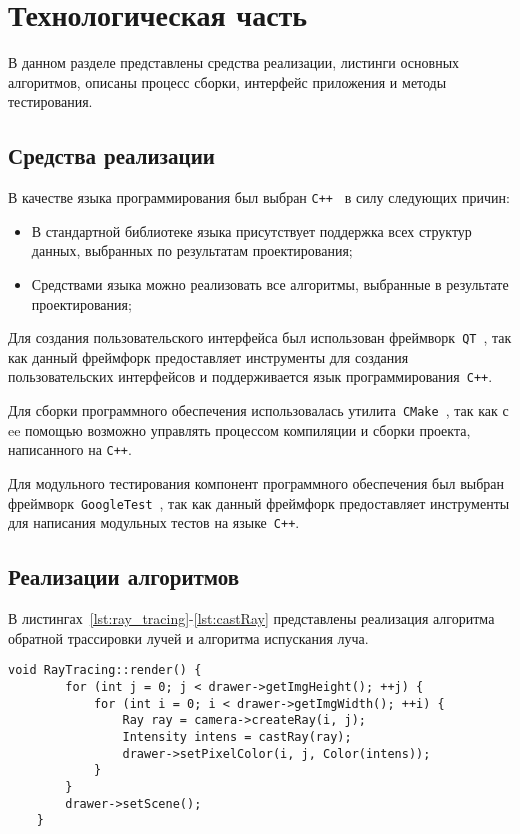 \chapter{Технологическая часть}

В данном разделе представлены средства реализации, листинги основных алгоритмов, описаны процесс сборки, интерфейс приложения и методы тестирования.

\section{Средства реализации}
В качестве языка программирования был выбран \texttt{C++}~\cite{cpp} в силу следующих причин:
\begin{itemize}
	\item В стандартной библиотеке языка присутствует поддержка всех структур данных, выбранных по результатам проектирования;
	\item Средствами языка можно реализовать все алгоритмы, выбранные в результате проектирования;
\end{itemize}

Для создания пользовательского интерфейса был использован фреймворк~\texttt{QT}~\cite{qt}, так как данный фреймфорк предоставляет инструменты для создания пользовательских интерфейсов и поддерживается язык программирования~\texttt{C++}.

Для сборки программного обеспечения использовалась утилита~\texttt{CMake}~\cite{cmake}, так как с ee помощью возможно управлять процессом компиляции и сборки проекта, написанного на \texttt{C++}.

Для модульного тестирования компонент программного обеспечения был выбран фреймворк~\texttt{GoogleTest}~\cite{gtest}, так как данный фреймфорк предоставляет инструменты для написания модульных тестов на языке~\texttt{C++}.

\clearpage
\section{Реализации алгоритмов}
В листингах~\ref{lst:ray_tracing}-\ref{lst:castRay} представлены реализация алгоритма обратной трассировки лучей и алгоритма испускания луча.

\begin{center}
	\captionsetup{justification=raggedright,singlelinecheck=off}
	\renewcommand{\lstlistingname}{Листинг}
	\begin{lstlisting}[label=lst:ray_tracing, caption=Реализация алгоритма обратной трассировки лучей]
	void RayTracing::render() {
		for (int j = 0; j < drawer->getImgHeight(); ++j) {
			for (int i = 0; i < drawer->getImgWidth(); ++i) {
				Ray ray = camera->createRay(i, j);
				Intensity intens = castRay(ray);
				drawer->setPixelColor(i, j, Color(intens));
			}
		}
		drawer->setScene();
	}
	\end{lstlisting}
\end{center}

